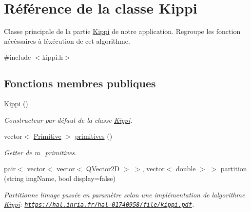 \hypertarget{classKippi}{}\section{Référence de la classe Kippi}
\label{classKippi}


Classe principale de la partie \hyperlink{classKippi}{Kippi} de notre application. Regroupe les fonction nécéssaires à l\textquotesingle{}éxécution de cet algorithme.  




{\ttfamily \#include $<$kippi.\+h$>$}

\subsection*{Fonctions membres publiques}
\begin{DoxyCompactItemize}
\item 
\mbox{\label{classKippi_a0b082ee735c823502a2d7942ba151da3}} 
\hyperlink{classKippi_a0b082ee735c823502a2d7942ba151da3}{Kippi} ()
\begin{DoxyCompactList}\small\item\em Constructeur par défaut de la classe \hyperlink{classKippi}{Kippi}. \end{DoxyCompactList}\item 
vector$<$ \hyperlink{classPrimitive}{Primitive} $>$ \hyperlink{classKippi_af783aa21eeb1b1974bd1b45fb0dbf673}{primitives} ()
\begin{DoxyCompactList}\small\item\em Getter de m\+\_\+primitives. \end{DoxyCompactList}\item 
pair$<$ vector$<$ vector$<$ Q\+Vector2D $>$ $>$, vector$<$ double $>$ $>$ \hyperlink{classKippi_ae9d153838b05fe37934d32152bf78539}{partition} (string img\+Name, bool display=false)
\begin{DoxyCompactList}\small\item\em Partitionne l\textquotesingle{}image passée en paramètre selon une implémentation de l\textquotesingle{}algorithme \hyperlink{classKippi}{Kippi}\+: \href{https://hal.inria.fr/hal-01740958/file/kippi.pdf}{\tt https\+://hal.\+inria.\+fr/hal-\/01740958/file/kippi.\+pdf}. \end{DoxyCompactList}\end{DoxyCompactItemize}

